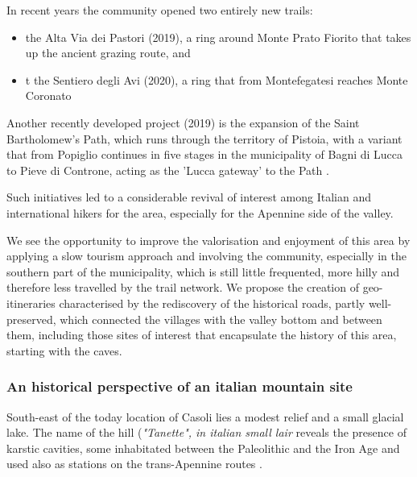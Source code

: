 \documentclass[sustainability,article,submit,pdftex,moreauthors]{Definitions/mdpi}
\begin{document}
In recent years the community opened two entirely new trails:
\begin{itemize}
	\item the Alta Via dei Pastori (2019), a ring around Monte Prato Fiorito that takes up the ancient grazing route, and
	\item t the Sentiero degli Avi (2020), a ring that from Montefegatesi
	reaches Monte Coronato \cite{pin21}
\end{itemize}

Another recently developed project (2019) is the expansion of the Saint Bartholomew's Path, which runs through the territory of Pistoia, with a
variant that from Popiglio continues in five stages in the municipality of Bagni di Lucca to Pieve di Controne, acting as the 'Lucca gateway' to the Path \cite{camsb}.

Such initiatives led to a considerable revival of interest among Italian and international hikers for the area, especially for the Apennine side of the valley.

We see the opportunity to improve the valorisation and enjoyment of this area by applying a slow tourism approach and involving the community, especially in the southern part of the municipality, which is still little frequented, more hilly and therefore less travelled by the trail network. We propose the creation of geo-itineraries characterised by the rediscovery of the historical roads, partly well-preserved, which connected the villages with the valley bottom and between them, including those sites of interest that encapsulate the history of this area, starting with the caves.

\subsubsection{An historical perspective of an italian mountain site}


South-east of the today location of Casoli lies a modest relief and a small glacial lake. The name of the hill ({\em "Tanette", in italian small lair} reveals the presence of karstic cavities, some inhabitated between the Paleolithic and the Iron Age and used also as stations on the trans-Apennine routes \cite{men76, gia96, pal63, zec72a, zec72b}.
\end{document}
